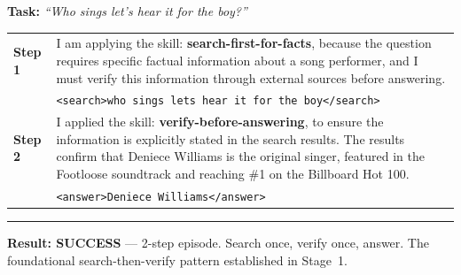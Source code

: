 \documentclass{article}
\theoremstyle{plain}
\theoremstyle{definition}
\theoremstyle{remark}
\begin{document}
\begin{tcolorbox}[
    colback=white, colframe=stage1color, width=\textwidth, sharp corners,
    boxrule=0.8pt, left=5pt, right=5pt, top=5pt, bottom=5pt,
    title=\textbf{Case 1 (Stage 1, Step 37): Simple Factual Lookup --- search-first-for-facts + verify-before-answering},
    fonttitle=\sffamily\small, colbacktitle=stage1color!10, coltitle=black
]
\small

\textbf{Task:} \textit{``Who sings let's hear it for the boy?''}

\vspace{4pt}
\begin{tabularx}{\linewidth}{@{}p{1.0cm} X@{}}
    \textbf{Step 1} & I am applying the skill: \textbf{\textcolor{skillcolor}{search-first-for-facts}}, because the question requires specific factual information about a song performer, and I must verify this information through external sources before answering. \\
    & \texttt{<search>who sings lets hear it for the boy</search>} \\
    \midrule
    \textbf{Step 2} & I applied the skill: \textbf{\textcolor{skillcolor}{verify-before-answering}}, to ensure the information is explicitly stated in the search results. The results confirm that Deniece Williams is the original singer, featured in the Footloose soundtrack and reaching \#1 on the Billboard Hot 100. \\
    & \texttt{<answer>Deniece Williams</answer>} \\
\end{tabularx}

\vspace{3pt}\hrule\vspace{3pt}
\textbf{\textcolor{successgreen}{Result: SUCCESS}} --- 2-step episode. Search once, verify once, answer. The foundational search-then-verify pattern established in Stage~1.
\end{tcolorbox}

\vspace{4pt}
\end{document}
